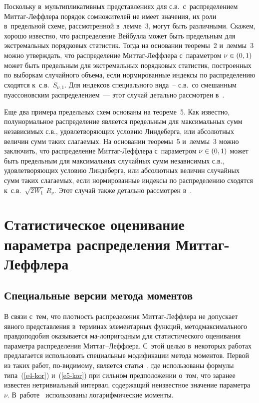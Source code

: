 \begin{multicols}{2}
Поскольку в~мультипликативных представлениях для с.в.\ 
с~распределением Мит\-таг-Леф\-фле\-ра порядок сомножителей не имеет
значения, их роли в~предельной схеме, рассмотренной в~лемме~3, могут
быть различными. Скажем, хорошо известно, что распределение Вейбулла
может быть предельным для экстремальных порядковых статистик. Тогда
на основании теоремы~2 и~леммы~3 можно утверждать, что распределение
Мит\-таг-Леф\-фле\-ра с~параметром $\nu\hm\in(0,1)$ может быть предельным для
экстремальных порядковых статистик, построенных по выборкам
случайного объема, если нормированные индексы по распределению
сходятся к~с.в.~$S_{\nu,1}$. Для индексов специального вида~-- 
с.в.\ со смешанным пуассоновским распределением~--- этот случай детально
рассмотрен в~\cite{KorolevZeifman2017}.


Еще два примера предельных схем основаны на теореме~5. Как известно,
полунормальное распределение является предельным для максимальных
сумм независимых с.в., удовлетворяющих условию Линдеберга, или
абсолютных величин сумм таких слагаемых. На основании теоремы~5 и~леммы~3 
можно заключить, что распределение Мит\-таг-Леф\-фле\-ра 
с~параметром $\nu\hm\in(0,1)$ может быть предельным для максимальных
случайных сумм независимых с.в., удовлетворяющих условию
Линдеберга, или абсолютных величин случайных сумм таких слагаемых,
если нормированные индексы по распределению сходятся к~с.в.~$\sqrt{2W_1}\,R_{\nu}$. 
Этот случай также детально рассмотрен в~\cite{KorolevZeifman2017}.


\section{Статистическое оценивание параметра распределения Миттаг-Леффлера}

\subsection{Специальные версии метода моментов}

В связи с~тем, что плотность распределения Мит\-таг-Леф\-фле\-ра не
допускает явного пред\-став\-ле\-ния в~терминах элементарных функций,
метод\linebreak максимального правдоподобия оказывается ма-\linebreak лопригодным для
статистического оценивания параметра распределения Мит\-таг--Леф\-фле\-ра.
С~этой целью в~некоторых работах предлагается использовать
специальные модификации метода моментов. Первой из таких работ,
по-ви\-ди\-мо\-му, является \mbox{статья}~\cite{Kozubowski2001}, где использованы
формулы типа~(\ref{e4-kor}) и~(\ref{e5-kor}) при сильном предположении о~том, что заранее
известен нетривиальный интервал, содержащий неизвестное значение
параметра~$\nu$. В~работе~\cite{Cahoy2013} использованы
логарифмические мо\-менты.
{ %

}
\end{multicols}
